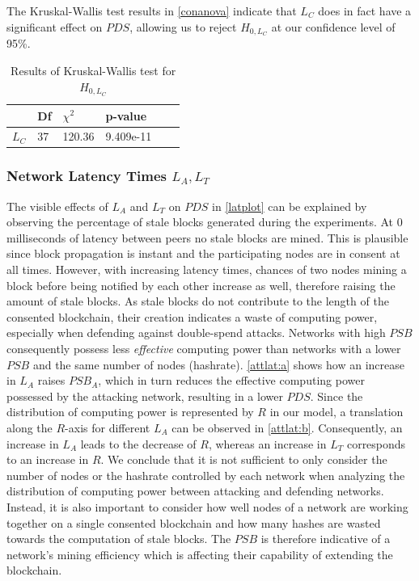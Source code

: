 \documentclass[a4paper,12pt,twoside]{report}
\begin{document}
The Kruskal-Wallis test results in \autoref{conanova} indicate that $L_C$ does in fact have a significant effect on $PDS$, allowing us to reject $H_{0,L_C}$ at our confidence level of 95\%.
\begin{table}[hb]
\centering
\begin{tabular}{|l|l|l|l|l|l|} \hline
& Df & $\chi^{2}$ & p-value \\ \hline
$L_C$ & 37 &  120.36 & 9.409e-11 \\ \hline
\end{tabular}
\caption{Results of Kruskal-Wallis test for $H_{0,L_C}$}
\label{conanova}
\end{table}
\subsubsection{Network Latency Times $L_{A},L_T$}
The visible effects of $L_{A}$ and $L_{T}$ on $PDS$ in \autoref{latplot} can be explained by observing the percentage of stale blocks generated during the experiments. At 0 milliseconds of latency between peers no stale blocks are mined. This is plausible since block propagation is instant and the participating nodes are in consent at all times. However, with increasing latency times, chances of two nodes mining a block before being notified by each other increase as well, therefore raising the amount of stale blocks. As stale blocks do not contribute to the length of the consented blockchain, their creation indicates a waste of computing power, especially when defending against double-spend attacks. Networks with high $PSB$ consequently possess less \textit{effective} computing power than networks with a lower $PSB$ and the same number of nodes (hashrate). \autoref{attlat:a} shows how an increase in $L_{A}$ raises $PSB_A$, which in turn reduces the effective computing power possessed by the attacking network, resulting in a lower $PDS$. Since the distribution of computing power is represented by $R$ in our model, a translation along the $R$-axis for different $L_{A}$ can be observed in \autoref{attlat:b}. Consequently, an increase in $L_{A}$ leads to the decrease of $R$, whereas an increase in $L_{T}$ corresponds to an increase in $R$. We conclude that it is not sufficient to only consider the number of nodes or the hashrate controlled by each network when analyzing the distribution of computing power between attacking and defending networks. Instead, it is also important to consider how well nodes of a network are working together on a single consented blockchain and how many hashes are wasted towards the computation of stale blocks. The $PSB$ is therefore indicative of a network's mining efficiency which is affecting their capability of extending the blockchain. 
\end{document}
